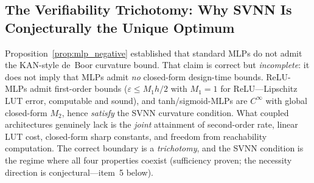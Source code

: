 
\subsection{The Verifiability Trichotomy: Why SVNN Is Conjecturally the Unique Optimum}
\label{sec:trichotomy}

Proposition~\ref{prop:mlp_negative} established that standard MLPs do not
admit the KAN-style de~Boor curvature bound. That claim is correct but
\emph{incomplete}: it does not imply that MLPs admit \emph{no} closed-form
design-time bounds. ReLU-MLPs admit first-order bounds ($\varepsilon \leq
M_1 h/2$ with $M_1 = 1$ for ReLU---Lipschitz LUT error, computable and
sound), and tanh/sigmoid-MLPs are $C^\infty$ with global closed-form $M_2$,
hence \emph{satisfy} the SVNN curvature condition. What coupled
architectures genuinely lack is the \emph{joint} attainment of second-order
rate, linear LUT cost, closed-form sharp constants, and freedom from
reachability computation. The correct boundary is a \emph{trichotomy}, and
the SVNN condition is the regime where all four properties coexist
(sufficiency proven; the necessity direction is conjectural---item~5 below).

